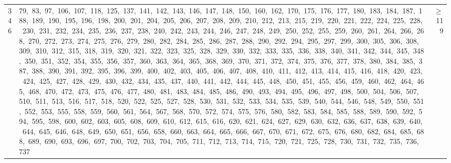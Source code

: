 \begin{longtable}{c|p{}|r}
346 & 79,\ 83,\ 97,\ 106,\ 107,\ 118,\ 125,\ 137,\ 141,\ 142,\ 143,\ 146,\ 147,\ 148,\ 150,\ 160,\ 162,\ 170,\ 175,\ 176,\ 177,\ 180,\ 183,\ 184,\ 187,\ 188,\ 189,\ 190,\ 195,\ 196,\ 198,\ 200,\ 201,\ 204,\ 205,\ 206,\ 207,\ 208,\ 209,\ 210,\ 212,\ 213,\ 215,\ 219,\ 220,\ 221,\ 222,\ 224,\ 225,\ 228,\ 230,\ 231,\ 232,\ 234,\ 235,\ 236,\ 237,\ 238,\ 240,\ 242,\ 243,\ 244,\ 246,\ 247,\ 248,\ 249,\ 250,\ 252,\ 255,\ 259,\ 260,\ 261,\ 264,\ 266,\ 268,\ 270,\ 272,\ 273,\ 274,\ 275,\ 276,\ 279,\ 280,\ 282,\ 284,\ 285,\ 286,\ 287,\ 288,\ 290,\ 292,\ 294,\ 295,\ 297,\ 299,\ 300,\ 305,\ 306,\ 308,\ 309,\ 310,\ 312,\ 315,\ 318,\ 319,\ 320,\ 321,\ 322,\ 323,\ 325,\ 328,\ 329,\ 330,\ 332,\ 333,\ 335,\ 336,\ 338,\ 340,\ 341,\ 342,\ 344,\ 345,\ 348,\ 350,\ 351,\ 352,\ 354,\ 355,\ 356,\ 357,\ 360,\ 363,\ 364,\ 365,\ 368,\ 369,\ 370,\ 371,\ 372,\ 374,\ 375,\ 376,\ 377,\ 378,\ 380,\ 384,\ 385,\ 387,\ 388,\ 390,\ 391,\ 392,\ 395,\ 396,\ 399,\ 400,\ 402,\ 403,\ 405,\ 406,\ 407,\ 408,\ 410,\ 411,\ 412,\ 413,\ 414,\ 415,\ 416,\ 418,\ 420,\ 423,\ 424,\ 425,\ 427,\ 428,\ 429,\ 430,\ 432,\ 434,\ 435,\ 437,\ 440,\ 441,\ 442,\ 444,\ 445,\ 448,\ 450,\ 451,\ 455,\ 456,\ 459,\ 460,\ 462,\ 464,\ 465,\ 468,\ 470,\ 472,\ 473,\ 475,\ 476,\ 477,\ 480,\ 481,\ 483,\ 484,\ 485,\ 486,\ 490,\ 493,\ 494,\ 495,\ 496,\ 497,\ 498,\ 500,\ 504,\ 506,\ 507,\ 510,\ 511,\ 513,\ 516,\ 517,\ 518,\ 520,\ 522,\ 525,\ 527,\ 528,\ 530,\ 531,\ 532,\ 533,\ 534,\ 535,\ 539,\ 540,\ 544,\ 546,\ 548,\ 549,\ 550,\ 551,\ 552,\ 553,\ 555,\ 558,\ 559,\ 560,\ 561,\ 564,\ 567,\ 568,\ 570,\ 572,\ 574,\ 575,\ 576,\ 580,\ 582,\ 583,\ 584,\ 585,\ 588,\ 589,\ 590,\ 592,\ 594,\ 595,\ 598,\ 600,\ 602,\ 603,\ 605,\ 608,\ 609,\ 610,\ 612,\ 615,\ 616,\ 620,\ 621,\ 624,\ 627,\ 629,\ 630,\ 632,\ 636,\ 637,\ 638,\ 639,\ 640,\ 644,\ 645,\ 646,\ 648,\ 649,\ 650,\ 651,\ 656,\ 658,\ 660,\ 663,\ 664,\ 665,\ 666,\ 667,\ 670,\ 671,\ 672,\ 675,\ 676,\ 680,\ 682,\ 684,\ 685,\ 688,\ 689,\ 690,\ 693,\ 696,\ 697,\ 700,\ 702,\ 703,\ 704,\ 705,\ 711,\ 712,\ 713,\ 714,\ 715,\ 720,\ 721,\ 725,\ 728,\ 730,\ 731,\ 732,\ 735,\ 736,\ 737 & $\ge$ 119 \\

\end{longtable}

